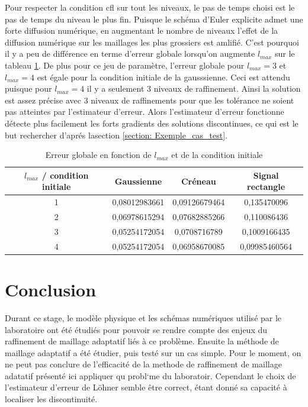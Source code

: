 \documentclass[12pt]{article}
\begin{document}
Pour respecter la condition cfl sur tout les niveaux, le pas de temps choisi est le pas de temps du niveau le plus fin. Puisque le schéma d'Euler explicite admet une forte diffusion numérique, en augmentant le nombre de niveaux l'effet de la diffusion numérique sur les maillages les plus grossiers est amlifié.
C'est pourquoi il y a peu de différence en terme d'erreur globale lorsqu'on augmente \(l_{max}\) sur le tableau \ref{tableau}.
De plus pour ce jeu de paramètre, l'erreur globale pour \(l_{max} = 3\) et \(l_{max} = 4\) est égale pour la condition initiale de la gausssienne. Ceci est attendu puisque pour \(l_{max} = 4\) il y a seulement 3 niveaux de raffinement.
Ainsi la solution est assez précise avec 3 niveaux de raffinements pour que les tolérance ne soient pas atteintes par l'estimateur d'erreur. Alors l'estimateur d'erreur fonctionne détecte plus facilement les forts gradients des solutions discontinues, ce qui est le but rechercher d'aprés lasection \ref{section: Exemple_cas_test}. 



\begin{table}[htbp]
    \begin{tabular}{|c|c|c|c|}
        \hline
        \(l_{max}\) / condition initiale & Gaussienne & Créneau & Signal rectangle \\
        \hline
        1 & 0,08012983661 & 0,09126679464 & 0,135470096 \\
        2 & 0,06978615294 & 0,07682885266 & 0,110086436 \\
        3 & 0,05254172054 & 0,0708716789 & 0,1009166435 \\
        4 & 0,05254172054 & 0,06958670085 & 0,09985460564 \\
        
        \hline        
    \end{tabular}
    \caption{Erreur globale en fonction de \(l_{max}\) et de la condition initiale}
    \label{tableau}
\end{table}

\section{Conclusion}

Durant ce stage, le modèle physique et les schémas numériques utilisé par le laboratoire ont été étudiés pour pouvoir se rendre compte des enjeux du raffinement de maillage adaptatif liés à ce problème.
Ensuite  la méthode de maillage adaptatif a été étudier, puis testé sur un cas simple.
Pour le moment, on ne peut pas conclure de l'efficacité de la methode de raffinement de maillage adatatif présenté ici appliquer qu probl`me du laboratoir.
Cependant le choix de l'estimateur d'erreur de Löhner semble être correct, étant donné sa capacité à localiser les discontinuité.\\
\end{document}
